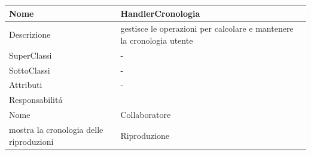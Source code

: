 \begin{center} %
    \begin{longtable}{ |p{3cm}|p{3cm}|p{3cm}|p{3cm}| }
        \hline
        Nome & \multicolumn{3}{|p{9cm}|}{HandlerCronologia} \\\hline
        Descrizione & \multicolumn{3}{|p{9cm}|}{gestisce le operazioni per calcolare e mantenere la cronologia utente} \\\hline
        SuperClassi & \multicolumn{3}{|p{9cm}|}{-} \\\hline
        SottoClassi & \multicolumn{3}{|p{9cm}|}{-} \\\hline
        Attributi & \multicolumn{3}{|p{9cm}|}{-} \\\hline
        \multicolumn{4}{|p{12cm}|}{Responsabilit\'a} \\\hline %
        \multicolumn{2}{|p{6cm}|}{Nome} & \multicolumn{2}{|p{6cm}|}{Collaboratore} \\\hline %
        \multicolumn{2}{|p{6cm}|}{mostra la cronologia delle riproduzioni} & \multicolumn{2}{|p{6cm}|}{Riproduzione} \\\hline
        \end{longtable}
\end{center}


